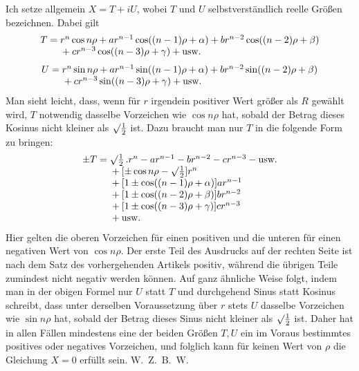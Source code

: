 Ich setze allgemein $X=T+iU$, wobei $T$ und $U$ selbstverständlich reelle Größen bezeichnen. Dabei gilt
\[
\begin{array}{r@{}l}
T={}&r^n\cos n\rho+ar^{n-1}\cos((n-1)\rho+\alpha)+br^{n-2}\cos((n-2)\rho+\beta)\\
&{}+cr^{n-3}\cos((n-3)\rho+\gamma)+\mbox{usw.}
\end{array}
\]
\[
\begin{array}{r@{}l}
U={}&r^n\sin n\rho+ar^{n-1}\sin((n-1)\rho+\alpha)+br^{n-2}\sin((n-2)\rho+\beta)\\
&{}+cr^{n-3}\sin((n-3)\rho+\gamma)+\mbox{usw.}
\end{array}
\]
Man sieht leicht, dass, wenn für $r$ irgendein positiver Wert größer als $R$ gewählt wird, $T$ notwendig dasselbe Vorzeichen wie $\cos n\rho$ hat, sobald der Betrag dieses Kosinus nicht kleiner als $\surd\frac12$ ist. Dazu braucht man nur $T$ in die folgende Form zu bringen:
\[
\begin{array}{r@{}l}
\pm T={}&\surd\frac12\,.r^n-ar^{n-1}-br^{n-2}-cr^{n-3}-\mbox{usw.}\\
&{}+[\pm\cos n\rho-\surd\frac12]r^n\\
&{}+[1\pm\cos((n-1)\rho+\alpha)]ar^{n-1}\\
&{}+[1\pm\cos((n-2)\rho+\beta)]br^{n-2}\\
&{}+[1\pm\cos((n-3)\rho+\gamma)]cr^{n-3}\\
&{}+\mbox{usw.}
\end{array}
\]
Hier gelten die oberen Vorzeichen für einen positiven und die unteren für einen negativen Wert von $\cos n\rho$. Der erste Teil des Ausdrucks auf der rechten Seite ist nach dem Satz des vorhergehenden Artikels positiv, während die übrigen Teile zumindest nicht negativ werden können. Auf ganz ähnliche Weise folgt, indem man in der obigen Formel nur $U$ statt $T$ und durchgehend Sinus statt Kosinus schreibt, dass unter derselben Voraussetzung über $r$ stets $U$ dasselbe Vorzeichen wie $\sin n\rho$ hat, sobald der Betrag dieses Sinus nicht kleiner als $\surd\frac12$ ist. Daher hat in allen Fällen mindestens eine der beiden Größen $T,U$ ein im Voraus bestimmtes positives oder negatives Vorzeichen, und folglich kann für keinen Wert von $\rho$ die Gleichung $X=0$ erfüllt sein. W.~Z.~B.~W.

